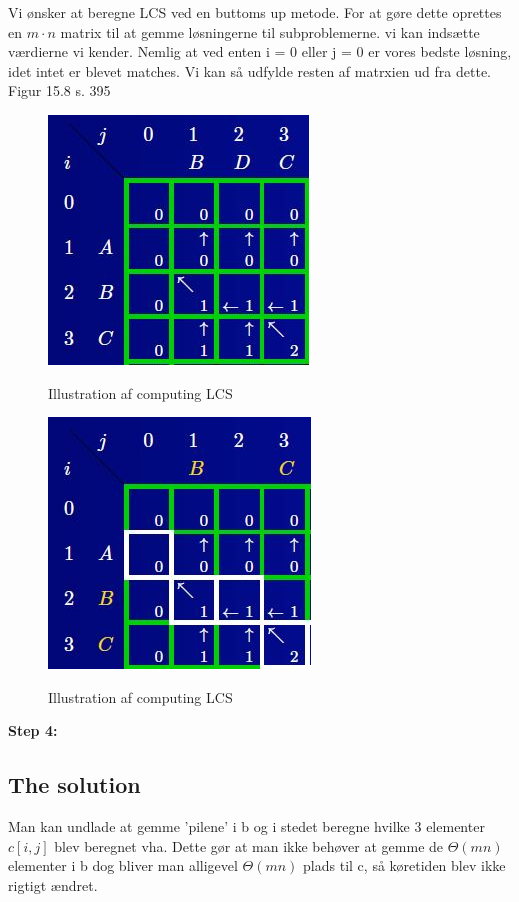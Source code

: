 \documentclass[11pt,a4paper]{report}
\theoremstyle{plain}
\theoremstyle{definition}
\theoremstyle{remark}
\numberwithin{equation}{section}
\begin{document}
Vi ønsker at beregne LCS ved en buttoms up metode. For at gøre dette oprettes en $m \cdot n$  matrix til at gemme løsningerne til subproblemerne. vi kan indsætte værdierne vi kender. Nemlig at ved enten i = 0 eller j = 0 er vores bedste løsning, idet intet er blevet matches. Vi kan så udfylde resten af matrxien ud fra dette. Figur 15.8 s. 395

\begin{figure}[H]
  \centering
  \includegraphics[scale=1]{pile.jpg}\\
  \caption{Illustration af computing LCS}
\end{figure}

\begin{figure}[H]
  \centering
  \includegraphics[scale=1]{listedone.jpg}\\
  \caption{Illustration af computing LCS}
\end{figure}

\textbf{Step 4:}
\subsection{The solution}
Man kan undlade at gemme 'pilene' i b og i stedet beregne hvilke 3 elementer $c[i,j]$ blev beregnet vha. Dette gør at man ikke behøver at gemme de $\Theta(mn)$ elementer i b dog bliver man alligevel $\Theta(mn)$ plads til c, så køretiden blev ikke rigtigt ændret.
\end{document}
